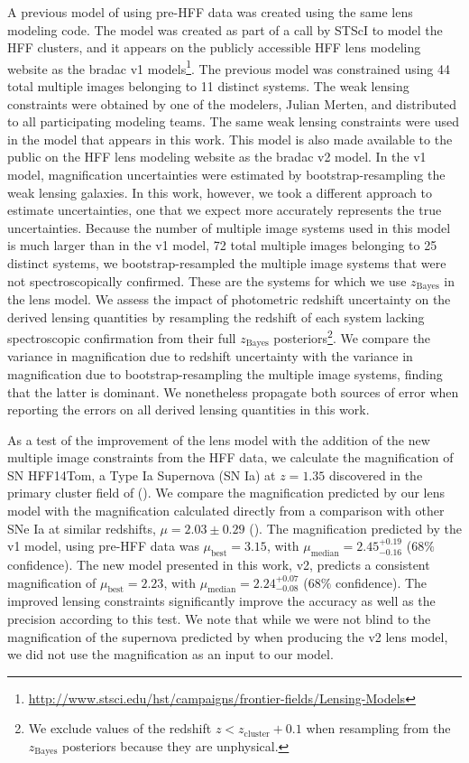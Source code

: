 A previous model of \cler using pre-HFF data was created using the same lens modeling code. The model was created
as part of a call by STScI to model the HFF clusters, and it appears on the publicly accessible HFF lens modeling
website as the bradac v1
models\footnote{\url{http://www.stsci.edu/hst/campaigns/frontier-fields/Lensing-Models}}. The previous model was
constrained using 44 total multiple images belonging to 11 distinct systems. The weak lensing constraints were
obtained by one of the modelers, Julian Merten, and distributed to all participating modeling teams. The same
weak lensing constraints were used in the model that appears in this work. This model is also made available to
the public on the HFF lens modeling website as the bradac v2 model.  In the v1 model, magnification uncertainties
were estimated by bootstrap-resampling the weak lensing galaxies. In this work, however, we took a different
approach to estimate uncertainties, one that we expect more accurately represents the true uncertainties.
Because the number of multiple image systems used in this model is much larger than in the v1 model, 72 total
multiple images belonging to 25 distinct systems, we bootstrap-resampled the multiple image systems that were not
spectroscopically confirmed.  These are the systems for which we use $z_{\textrm{Bayes}}$ in the lens model.
We assess the impact of photometric redshift uncertainty on the derived lensing quantities by resampling
the redshift of each system lacking spectroscopic confirmation from their full $z_{\textrm{Bayes}}$
posteriors\footnote{We exclude values of the redshift $z<z_{\textrm{cluster}}+0.1$ when resampling from the
$z_{\textrm{Bayes}}$ posteriors because they are unphysical.}. We compare the variance in magnification due to
redshift uncertainty with the variance in magnification due to bootstrap-resampling the multiple image systems,
finding that the latter is dominant. We nonetheless propagate both sources of error when reporting the errors on
all derived lensing quantities in this work.

As a test of the improvement of the lens model with the addition of the new multiple image constraints from the
HFF data, we calculate the magnification of SN HFF14Tom, a Type Ia Supernova (SN Ia) at $z=1.35$ discovered in
the primary cluster field of \cler (\citealp{Rod++15}). We compare the magnification predicted by our lens model
with the magnification calculated directly from a comparison with other SNe Ia at similar redshifts,
$\mu=2.03\pm0.29$ (\citealp{Rod++15}). The magnification predicted by the v1 model, using pre-HFF data was
$\mu_{\mathrm{best}} = 3.15$, with $\mu_{\mathrm{median}} = 2.45^{+0.19}_{-0.16}$ ($68\%$ confidence).
The new model presented in this work, v2, predicts a consistent magnification of $\mu_{\mathrm{best}} =
2.23$, with $\mu_{\mathrm{median}} = 2.24^{+0.07}_{-0.08}$ ($68\%$ confidence). The improved lensing constraints
significantly improve the accuracy as well as the precision according to this test. We note that while we were
not blind to the magnification of the supernova predicted by \citet{Rod++15} when producing the v2 lens model, we
did not use the magnification as an input to our model. 

